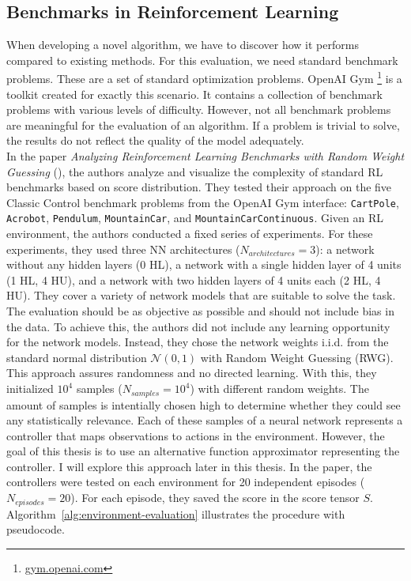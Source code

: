 \subsection{Benchmarks in Reinforcement Learning}
When developing a novel algorithm, we have to discover how it performs compared to existing methods.
For this evaluation, we need standard benchmark problems. These are a set of standard optimization problems. OpenAI Gym \footnote{\url{gym.openai.com}} is a toolkit created for exactly this scenario. It contains a collection of benchmark problems with various levels of difficulty. However, not all benchmark problems are meaningful for the evaluation of an algorithm. If a problem is trivial to solve, the results do not reflect the quality of the model adequately. \\
In the paper \emph{Analyzing Reinforcement Learning Benchmarks with Random Weight Guessing} (\citet{oller_analyzing_2020}), the authors analyze and visualize the complexity of standard RL benchmarks based on score distribution. They tested their approach on the five Classic Control benchmark problems from the OpenAI Gym interface: \verb|CartPole|, \verb|Acrobot|, \verb|Pendulum|, \verb|MountainCar|, and \verb|MountainCarContinuous|.
Given an RL environment, the authors conducted a fixed series of experiments. For these experiments, they used three NN architectures ($N_{architectures}=3$): a network without any hidden layers (0 HL), a network with a single hidden layer of 4 units (1 HL, 4 HU), and a network with two hidden layers of 4 units each (2 HL, 4 HU). They cover a variety of network models that are suitable to solve the task. The evaluation should be as objective as possible and should not include bias in the data. To achieve this, the authors did not include any learning opportunity for the network models. Instead, they chose the network weights i.i.d. from the standard normal distribution $\mathcal{N}(0,1)$ with Random Weight Guessing (RWG). This approach assures randomness and no directed learning. With this, they initialized $10^4$ samples ($N_{samples}=10^4$) with different random weights. The amount of samples is intentially chosen high to determine whether they could see any statistically relevance. Each of these samples of a neural network represents a controller that maps observations to actions in the environment. However, the goal of this thesis is to use an alternative function approximator representing the controller. I will explore this approach later in this thesis. In the paper, the controllers were tested on each environment for 20 independent episodes ($N_{episodes}=20$). For each episode, they saved the score in the score tensor $S$. Algorithm~\ref{alg:environment-evaluation} illustrates the procedure with pseudocode.

